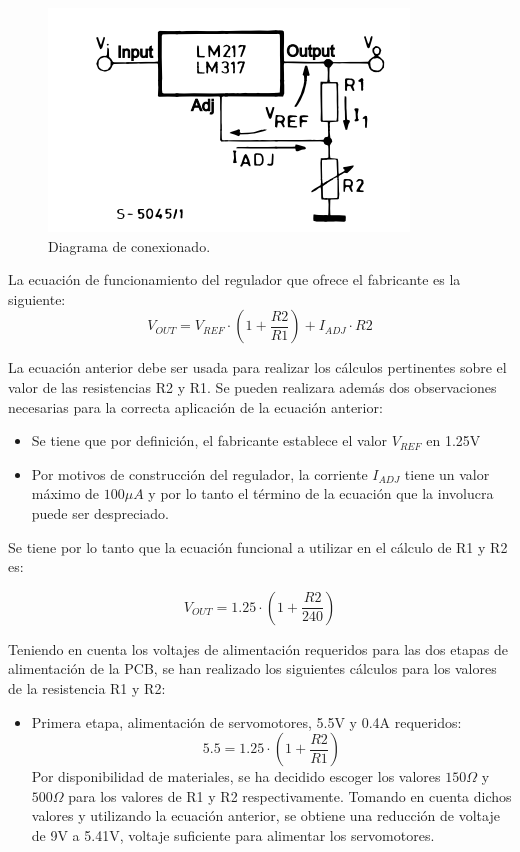 \begin{figure}[H]
    \centering 
    \includegraphics[width=.6\linewidth]{pictures/Lm317 conexionado.PNG}
    \caption{Diagrama de conexionado.}
    \label{fig:kdiagram}
\end{figure}


La ecuación de funcionamiento del regulador que ofrece el fabricante es la siguiente:
\begin{equation}
    V_{OUT} = V_{REF} \cdot ( 1 + \frac{R2}{R1}) + I_{ADJ} \cdot R2
\end{equation}

La ecuación anterior debe ser usada para realizar los cálculos pertinentes sobre el valor de las resistencias R2 y R1. Se pueden realizara además dos observaciones necesarias para la correcta aplicación de la ecuación anterior:
\begin{itemize}
    \item Se tiene que por definición, el fabricante establece el valor $V_{REF}$ en 1.25V
    \item Por motivos de construcción del regulador, la corriente $I_{ADJ}$ tiene un valor máximo de $100 \mu A$ y por lo tanto el término de la ecuación que la involucra puede ser despreciado.
\end{itemize}

Se tiene por lo tanto que la ecuación funcional a utilizar en el cálculo de R1 y R2 es:

\begin{equation}
    V_{OUT} = 1.25 \cdot ( 1 + \frac{R2}{240}) 
\end{equation}

Teniendo en cuenta los voltajes de alimentación requeridos para las dos etapas de alimentación de la PCB, se han realizado los siguientes cálculos para los valores de la resistencia R1 y R2:
\begin{itemize}
    \item Primera etapa, alimentación de servomotores, 5.5V y 0.4A requeridos:
    \begin{equation}
        5.5 = 1.25 \cdot ( 1 + \frac{R2}{R1}) 
    \end{equation}
    Por disponibilidad de materiales, se ha decidido escoger los valores $150 \Omega$ y $500 \Omega$ para los valores de R1 y R2 respectivamente. Tomando en cuenta dichos valores y utilizando la ecuación anterior, se obtiene una reducción de voltaje de 9V a 5.41V, voltaje suficiente para alimentar los servomotores.
\end{itemize}

